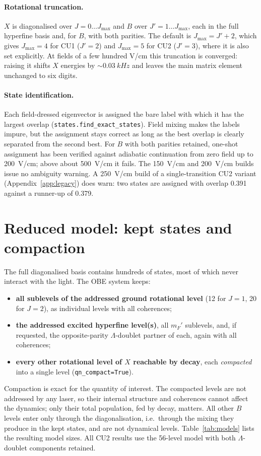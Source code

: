 \documentclass[11pt,a4paper,oneside]{report}
\newcommand{\code}[1]{\texttt{#1}}
\begin{document}
\paragraph{Rotational truncation.} $X$ is diagonalised over $J=0\ldots J_{\max}$ and $B$ over
$J'=1\ldots J_{\max}$, each in the full hyperfine basis and, for $B$, with both parities. The
default is $J_{\max}=J'+2$, which gives $J_{\max}=4$ for CU1 ($J'=2$) and $J_{\max}=5$ for CU2
($J'=3$), where it is also set explicitly. At fields of a few hundred V/cm this truncation is
converged: raising it shifts $X$ energies by $\sim\SI{0.03}{kHz}$ and leaves the main matrix
element unchanged to six digits.

\paragraph{State identification.} Each field-dressed eigenvector is assigned the bare label
with which it has the largest overlap (\code{states.find\_exact\_states}). Field mixing makes
the labels impure, but the assignment stays correct as long as the best overlap is clearly
separated from the second best. For $B$ with both parities retained, one-shot assignment has
been verified against adiabatic continuation from zero field up to \SI{200}{V/cm}; above
about \SI{500}{V/cm} it fails. The \SI{150}{V/cm} and \SI{200}{V/cm} builds issue no
ambiguity warning. A \SI{250}{V/cm} build of a single-transition CU2 variant
(Appendix~\ref{app:legacy}) does warn: two states are assigned with overlap 0.391 against a
runner-up of 0.379.

\section{Reduced model: kept states and compaction}
\label{sec:reduced}

The full diagonalised basis contains hundreds of states, most of which never interact with
the light. The OBE system keeps:
\begin{itemize}
  \item \textbf{all sublevels of the addressed ground rotational level} (12 for $J=1$, 20 for
        $J=2$), as individual levels with all coherences;
  \item \textbf{the addressed excited hyperfine level(s)}, all $m_F'$ sublevels, and, if
        requested, the opposite-parity $\Lambda$-doublet partner of each, again with all
        coherences;
  \item \textbf{every other rotational level of $X$ reachable by decay}, each
        \emph{compacted} into a single level (\code{qn\_compact=True}).
\end{itemize}
Compaction is exact for the quantity of interest. The compacted levels are not addressed by
any laser, so their internal structure and coherences cannot affect the dynamics; only their
total population, fed by decay, matters. All other $B$ levels enter only through the
diagonalisation, i.e.\ through the mixing they produce in the kept states, and are not
dynamical levels. Table~\ref{tab:models} lists the resulting model sizes. All CU2 results use
the 56-level model with both $\Lambda$-doublet components retained.
\end{document}

